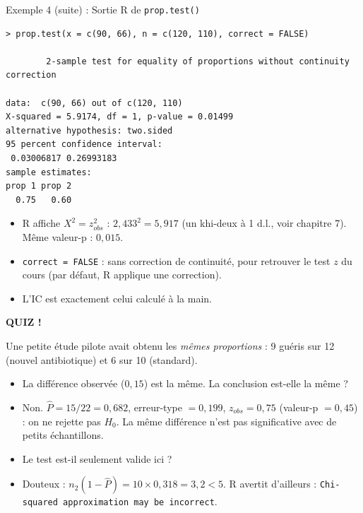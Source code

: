 \documentclass{BeamerTemplate}
\begin{document}
\begin{frame}[fragile,t]{Exemple 4 (suite) : Sortie R de \texttt{prop.test()}}
\begin{Verbatim}[fontsize=\scriptsize]
> prop.test(x = c(90, 66), n = c(120, 110), correct = FALSE)

        2-sample test for equality of proportions without continuity correction

data:  c(90, 66) out of c(120, 110)
X-squared = 5.9174, df = 1, p-value = 0.01499
alternative hypothesis: two.sided
95 percent confidence interval:
 0.03006817 0.26993183
sample estimates:
prop 1 prop 2
  0.75   0.60
\end{Verbatim}

  \small
  \begin{itemize}\itemsep 1.5mm
    \item R affiche $X^2 = z_{obs}^2$ : $2{,}433^2 = 5{,}917$ (un khi-deux à 1 d.l., voir chapitre 7). Même valeur-p : $0{,}015$.
    \item \texttt{correct = FALSE} : sans correction de continuité, pour retrouver le test $z$ du cours (par défaut, R applique une correction).
    \item L'IC est exactement celui calculé à la main.
  \end{itemize}
\end{frame}

\begin{frame}[plain,t]
  \centerline{\LARGE\bfseries\alert{QUIZ !}}

  \medskip
  Une petite étude pilote avait obtenu les \emph{mêmes proportions} : 9 guéris sur 12 (nouvel antibiotique) et 6 sur 10 (standard).
  \begin{itemize}\itemsep 0.7cm
    \item La différence observée ($0{,}15$) est la même. La conclusion est-elle la même ?
    \item<2-> \alert{Non.} $\widehat{P} = 15/22 = 0{,}682$, erreur-type $= 0{,}199$, $z_{obs} = 0{,}75$ (valeur-p $= 0{,}45$) : on ne rejette pas $H_0$. La même différence n'est pas significative avec de petits échantillons.
    \item Le test est-il seulement valide ici ?
    \item<2-> Douteux : $n_2(1 - \widehat{P}) = 10 \times 0{,}318 = 3{,}2 < 5$. R avertit d'ailleurs : \texttt{Chi-squared approximation may be incorrect}.
  \end{itemize}
\end{frame}
\end{document}
